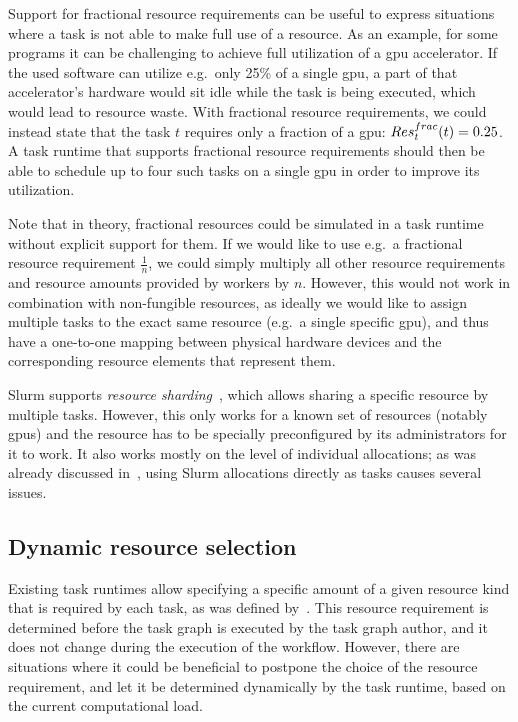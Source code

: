 Support for fractional resource requirements can be useful to express situations where a task is
not able to make full use of a resource. As an example, for some programs it can be challenging to
achieve full utilization of a \gls{gpu} accelerator. If the used software can utilize
e.g.\ only 25\% of a single \gls{gpu}, a part of that accelerator's hardware would
sit idle while the task is being executed, which would lead to resource waste. With fractional
resource requirements, we could instead state that the task $t$ requires only a
fraction of a \gls{gpu}: $Res_t^{frac}(t) = 0.25$. A task runtime that supports
fractional resource requirements should then be able to schedule up to four such tasks on a single
\gls{gpu} in order to improve its utilization.

Note that in theory, fractional resources could be simulated in a task runtime without explicit
support for them. If we would like to use e.g.\ a fractional resource requirement
$\frac{1}{n}$, we could simply multiply all other resource requirements and resource
amounts provided by workers by $n$. However, this would not work in combination
with non-fungible resources, as ideally we would like to assign multiple tasks to the exact same
resource (e.g.\ a single specific \gls{gpu}), and thus have a one-to-one mapping
between physical hardware devices and the corresponding resource elements that represent them.

Slurm supports \emph{resource sharding}~\cite{slurm-sharding}, which allows sharing a specific
resource by multiple tasks. However, this only works for a known set of resources (notably
\glspl{gpu}) and the resource has to be specially preconfigured by its administrators
for it to work. It also works mostly on the level of individual allocations; as was already
discussed in~, using Slurm allocations directly as tasks causes several
issues.

\subsection{Dynamic resource selection}
\label{sec:dynamic-resource-selection}
Existing task runtimes allow specifying a specific amount of a given resource kind that is required
by each task, as was defined by~. This resource requirement is determined
before the task graph is executed by the task graph author, and it does not change during the
execution of the workflow. However, there are situations where it could be beneficial to postpone
the choice of the resource requirement, and let it be determined dynamically by the task runtime,
based on the current computational load.

